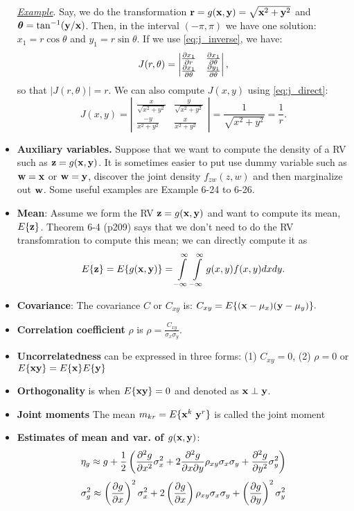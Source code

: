 \documentclass[a4paper, oneside]{book}
\begin{document}
\begin{itemize}
\underline{\textit{Example}}. Say, we do the transformation $\mathbf r = g(\mathbf{x,y}) = \sqrt{\mathbf x^2+\mathbf y^2}$ and $\boldsymbol \theta = \tan^{-1}(\mathbf{y/x})$. Then, in the interval $(-\pi,\pi)$ we have one solution: $x_1 = r\cos \theta$ and $y_1 = r \sin \theta$. If we use \eqref{eq:j_inverse}, we have: %
$$J(r,\theta) = \left| \begin{matrix} \frac{\partial x_1}{\partial r} & \frac{\partial x_1}{\partial \theta} \\ 
\frac{\partial x_1}{\partial \theta} & \frac{\partial y_1}{\partial \theta} \end{matrix}\right|,$$
%
so that $|J(r,\theta)| = r$. We can also compute $J(x,y)$ using \eqref{eq:j_direct}: %
$$J(x,y) = \left| \begin{matrix}
\frac{x}{\sqrt{x^2+y^2}} & \frac{y}{\sqrt{x^2+y^2}} \\
\frac{-y}{x^2+y^2} & \frac{x}{x^2+y^2}
\end{matrix} \right| = \frac{1}{\sqrt{x^2+y^2}} = \frac{1}{r}.$$ 
%
\item \textbf{Auxiliary variables.}  Suppose that we want to compute the density of a RV such as $\mathbf z = g(\mathbf{x,y})$. It is sometimes easier to put use dummy variable such as $\mathbf{w=x}$ or $\mathbf{w=y}$, discover the joint density $f_{zw}(z,w)$ and then marginalize out $\mathbf w$. Some useful examples are Example 6-24 to 6-26.

\item \textbf{Mean}: Assume we form the RV $\mathbf z = g(\mathbf{x,y})$ and want to compute its mean, $E\{\mathbf z\}$. Theorem 6-4 (p209) says that we don't need to do the RV transfomration to compute this mean; we can directly compute it as $$E\{\mathbf z\} = E\{g(\mathbf{x,y})\} = \int\limits_{-\infty}^{\infty}\int\limits_{-\infty}^{\infty} g(x,y) f(x,y) dx dy.$$
\item \textbf{Covariance}: The covariance $C$ or $C_{xy}$ is: $C_{xy} = E\{(\mathbf x - \mu_x)(\mathbf y - \mu_y)\}.$
\item \textbf{Correlation coefficient} $\rho$ is $\rho = \frac{C_{xy}}{\sigma_x \sigma_y}$.
\item \textbf{Uncorrelatedness} can be expressed in three forms: (1) $C_{xy} = 0$, (2) $\rho = 0$ or $E\{\mathbf{xy}\} = E\{\mathbf x\}E\{\mathbf y\}$
\item \textbf{Orthogonality}  is  when $E\{\mathbf{xy}\} = 0$ and denoted as $\mathbf x \perp \mathbf y$. \item \textbf{Joint moments} The mean $m_{kr} = E\{\mathbf x^k\ \mathbf y^r\}$ is called the joint moment
\item \textbf{Estimates of mean and var. of $g(\mathbf{x,y})$}: $$\eta_g \approx g + \frac{1}{2}\left( \frac{\partial^2 g}{\partial x^2}\sigma_x^2 + 2 \frac{\partial^2g}{\partial x \partial y}\rho_{xy} \sigma_x  \sigma_y + \frac{\partial^2 g}{\partial y^2} \sigma_y^2  \right)$$
$$\sigma_g^2 \approx \left( \frac{\partial g}{\partial x} \right)^2 \sigma_x^2  + 2\left( \frac{\partial g}{\partial x} \right) \rho_{xy}\sigma_x \sigma_y  + \left( \frac{\partial g}{\partial y} \right)^2\sigma_y^2 $$
\end{itemize}
\end{document}
